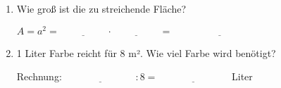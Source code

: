 \begin{enumerate}[label=\arabic*.]
    \begin{enumerate}[label=\alph*)]
        \item Wie groß ist die zu streichende Fläche?

        $A = a^2 = \underline{\hspace{2cm}} \cdot \underline{\hspace{2cm}} = \underline{\hspace{4cm}}$

        \vspace{0.5cm}

        \item 1 Liter Farbe reicht für 8 m². Wie viel Farbe wird benötigt?

        Rechnung: $\underline{\hspace{3cm}} : 8 = \underline{\hspace{3cm}}$ Liter
    \end{enumerate}
\end{enumerate}